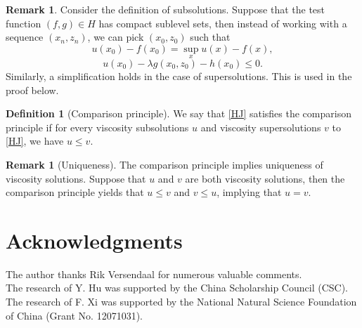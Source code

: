 \documentclass[a4paper]{article}
\numberwithin{equation}{section}
\theoremstyle{definition}
\newtheorem{definition}[theorem]{Definition}
\newtheorem{remark}[theorem]{Remark}
\begin{document}
\begin{remark}
	Consider the definition of subsolutions. Suppose that the test function $(f,g)\in H$ has compact sublevel sets, then instead of working with a sequence $(x_n,z_n)$, we can pick $(x_0,z_0)$ such that
	\begin{equation*}
		u(x_0)-f(x_0)=\sup_{x}u(x)-f(x),
	\end{equation*}
	\begin{equation*}
		u(x_0)-\lambda g(x_0,z_0)-h(x_0)\leq 0.
	\end{equation*}
	Similarly, a simplification holds in the case of supersolutions. This is used in the proof  below.
\end{remark}
\begin{definition}[Comparison principle]
	We say that \eqref{HJ} satisfies the comparison principle if for every viscosity subsolutions $u$ and viscosity supersolutions $v$ to \eqref{HJ}, we have $u\leq v$.
\end{definition}

\begin{remark}[Uniqueness] 
	The comparison principle implies uniqueness of viscosity solutions. Suppose that $u$ and $v$ are both viscosity solutions, then the comparison principle yields that $u\leq v$ and $v\leq u$, implying that $u=v$.
\end{remark}


\section*{Acknowledgments}
The author thanks Rik Versendaal for numerous valuable comments.
\\[0.2cm]
The research of Y. Hu was supported by the China Scholarship Council (CSC).
The research of F. Xi was supported by the National Natural Science Foundation of China (Grant No. 12071031). 


%	
%	
%	
%	
%	
%	
%	
%	
	

\printbibliography
%
%
\end{document}
